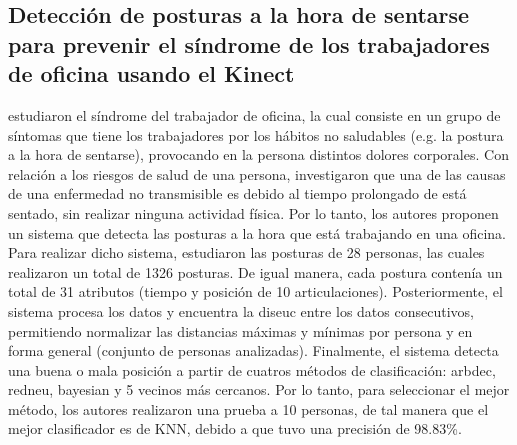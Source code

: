 \subsection{Detecci\'on de posturas a la hora de sentarse para prevenir el s\'indrome de los trabajadores de oficina usando el Kinect} \label{tr:3}
 estudiaron el s\'indrome del trabajador de oficina, la cual consiste en un grupo de s\'intomas que tiene los trabajadores por los h\'abitos no saludables (e.g. la postura a la hora de sentarse), provocando en la persona distintos dolores corporales.
\medbreak
Con relaci\'on a los riesgos de salud de una persona,  investigaron que una de las causas de una enfermedad no transmisible es debido al tiempo prolongado de est\'a sentado, sin realizar ninguna actividad f\'isica. Por lo tanto, los autores  proponen un sistema que detecta las posturas a la hora que est\'a trabajando en una oficina.
\medbreak
Para realizar dicho sistema,  estudiaron las posturas de 28 personas, las cuales realizaron un total de 1326 posturas. De igual manera, cada postura conten\'ia un total de 31 atributos (tiempo y posici\'on de 10 articulaciones). Posteriormente, el sistema procesa los datos y encuentra la \gls{diseuc} entre los datos consecutivos, permitiendo normalizar las distancias m\'aximas y m\'inimas por persona y en forma general (conjunto de personas analizadas).
\medbreak
Finalmente, el sistema detecta una buena o mala posici\'on a partir de cuatros m\'etodos de clasificaci\'on: \gls{arbdec}, \gls{redneu}, \gls{bayesian} y 5 vecinos m\'as cercanos. Por lo tanto, para seleccionar el mejor m\'etodo, los autores realizaron una prueba a 10 personas, de tal manera que el mejor  clasificador es de \acrfull{KNN}, debido a que tuvo una precisi\'on de  98.83\%. 
